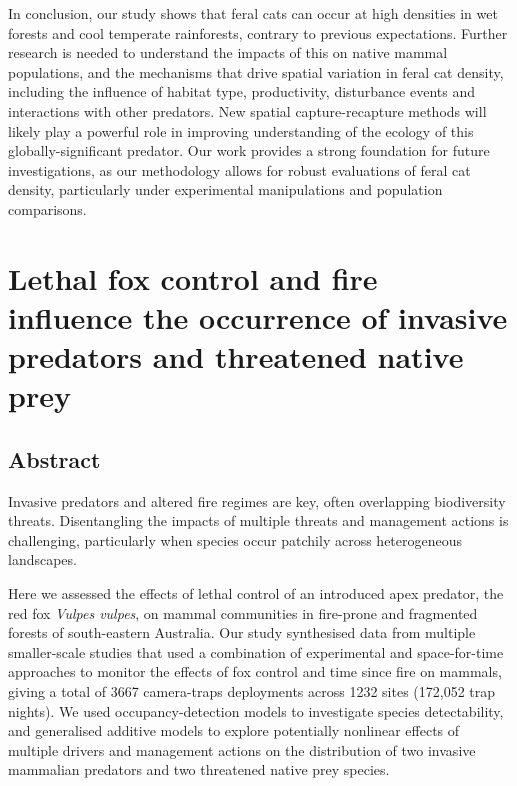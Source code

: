 \documentclass[11pt,a4paper,titlepage,twoside,openright]{style/unimelbthesis}
\begin{document}
\begin{mainmatter}
In conclusion, our study shows that feral cats can occur at high densities in wet forests and cool temperate rainforests, contrary to previous expectations. Further research is needed to understand the impacts of this on native mammal populations, and the mechanisms that drive spatial variation in feral cat density, including the influence of habitat type, productivity, disturbance events and interactions with other predators. New spatial capture-recapture methods will likely play a powerful role in improving understanding of the ecology of this globally-significant predator. Our work provides a strong foundation for future investigations, as our methodology allows for robust evaluations of feral cat density, particularly under experimental manipulations and population comparisons.

\hypertarget{occ}{%
\chapter{Lethal fox control and fire influence the occurrence of invasive predators and threatened native prey}\label{occ}}

\hypertarget{abstract-1}{%
\section*{Abstract}\label{abstract-1}}

Invasive predators and altered fire regimes are key, often overlapping biodiversity threats. Disentangling the impacts of multiple threats and management actions is challenging, particularly when species occur patchily across heterogeneous landscapes.

Here we assessed the effects of lethal control of an introduced apex predator, the red fox \emph{Vulpes vulpes}, on mammal communities in fire-prone and fragmented forests of south-eastern Australia. Our study synthesised data from multiple smaller-scale studies that used a combination of experimental and space-for-time approaches to monitor the effects of fox control and time since fire on mammals, giving a total of 3667 camera-traps deployments across 1232 sites (172,052 trap nights). We used occupancy-detection models to investigate species detectability, and generalised additive models to explore potentially nonlinear effects of multiple drivers and management actions on the distribution of two invasive mammalian predators and two threatened native prey species.


\end{mainmatter}
\end{document}
